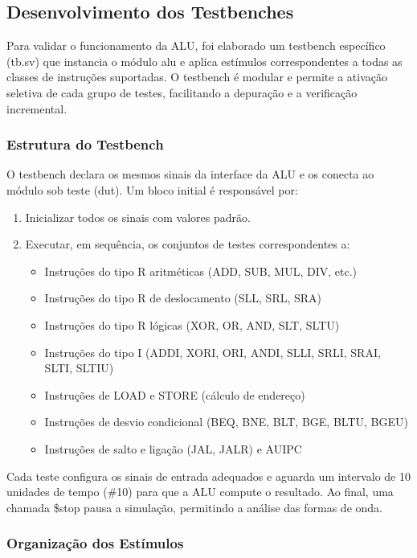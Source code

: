 \documentclass[
	12pt,				%
	oneside,
	a4paper,			%
	english,			%
	french,				%
	spanish,			%
	brazil,				%
	]{abntex2}
\begin{document}
\subsection{Desenvolvimento dos Testbenches}

Para validar o funcionamento da ALU, foi elaborado um testbench específico (tb.sv) que instancia o módulo alu e aplica estímulos correspondentes a todas as classes de instruções suportadas. O testbench é modular e permite a ativação seletiva de cada grupo de testes, facilitando a depuração e a verificação incremental.

\subsubsection{Estrutura do Testbench}

O testbench declara os mesmos sinais da interface da ALU e os conecta ao módulo sob teste (dut). Um bloco initial é responsável por:
\begin{enumerate}
    \item Inicializar todos os sinais com valores padrão.
    \item Executar, em sequência, os conjuntos de testes correspondentes a:
    \begin{itemize}
        \item Instruções do tipo R aritméticas (ADD, SUB, MUL, DIV, etc.)
        \item Instruções do tipo R de deslocamento (SLL, SRL, SRA)
        \item Instruções do tipo R lógicas (XOR, OR, AND, SLT, SLTU)
        \item Instruções do tipo I (ADDI, XORI, ORI, ANDI, SLLI, SRLI, SRAI, SLTI, SLTIU)
        \item Instruções de LOAD e STORE (cálculo de endereço)
        \item Instruções de desvio condicional (BEQ, BNE, BLT, BGE, BLTU, BGEU)
        \item Instruções de salto e ligação (JAL, JALR) e AUIPC
    \end{itemize}
\end{enumerate}

Cada teste configura os sinais de entrada adequados e aguarda um intervalo de 10 unidades de tempo (\#10) para que a ALU compute o resultado. Ao final, uma chamada \$stop pausa a simulação, permitindo a análise das formas de onda.

\subsubsection{Organização dos Estímulos}
\end{document}
